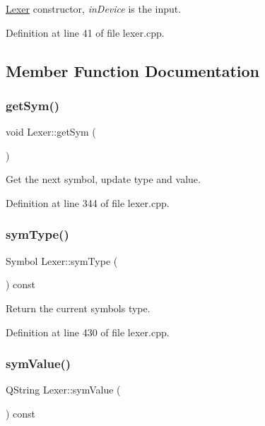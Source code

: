 \hyperlink{class_bww_1_1_lexer}{Lexer} constructor, {\itshape in\+Device} is the input. 

Definition at line 41 of file lexer.\+cpp.



\subsection{Member Function Documentation}
\mbox{\label{class_bww_1_1_lexer_a2049b1ff9fef46bbd0cfd38ac32b1f2a}} 
\subsubsection{\texorpdfstring{get\+Sym()}{getSym()}}
{\footnotesize\ttfamily void Lexer\+::get\+Sym (\begin{DoxyParamCaption}{ }\end{DoxyParamCaption})}

Get the next symbol, update type and value. 

Definition at line 344 of file lexer.\+cpp.

\mbox{\label{class_bww_1_1_lexer_a3182277744cedcec7c5d390ed3be128d}} 
\subsubsection{\texorpdfstring{sym\+Type()}{symType()}}
{\footnotesize\ttfamily Symbol Lexer\+::sym\+Type (\begin{DoxyParamCaption}{ }\end{DoxyParamCaption}) const}

Return the current symbols type. 

Definition at line 430 of file lexer.\+cpp.

\mbox{\label{class_bww_1_1_lexer_ab325630a55c0a1f537d44d9f78b9f914}} 
\subsubsection{\texorpdfstring{sym\+Value()}{symValue()}}
{\footnotesize\ttfamily Q\+String Lexer\+::sym\+Value (\begin{DoxyParamCaption}{ }\end{DoxyParamCaption}) const}

